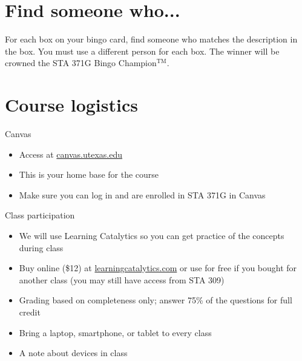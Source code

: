 \documentclass{beamer}\usepackage[]{graphicx}\usepackage[]{color}
\begin{document}
\begin{darkframes}
    \section{Find someone who...}
    
    \begin{frame}{}
      \begin{center}
        For each box on your bingo card, find someone who matches the description in the box. You must use a different person for each box.
        \vfill
        The winner will be crowned the STA 371G Bingo Champion$^{\text{TM}}$.
      \end{center}
    \end{frame}

    \section{Course logistics}

    \begin{frame}{Canvas}
      \begin{itemize}
        \item Access at \url{canvas.utexas.edu}
        \item This is your home base for the course
        \item Make sure you can log in and are enrolled in STA 371G in Canvas
      \end{itemize}
    \end{frame}

    \begin{frame}{Class participation}
      \begin{itemize}
        \item We will use \alert{Learning Catalytics} so you can get practice of the concepts during class
        \item Buy online (\$12) at \url{learningcatalytics.com} or use for free if you bought for another class (you may still have access from STA 309)
        \item Grading based on completeness only; answer 75\% of the questions for full credit
        \item Bring a laptop, smartphone, or tablet to every class
        \item A note about devices in class
      \end{itemize}
    \end{frame}


\end{darkframes}
\end{document}
